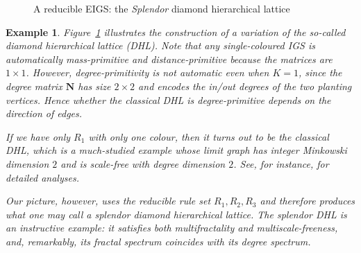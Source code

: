 \documentclass[12pt]{iopart}
\newtheorem{example}[theorem]{Example}
\begin{document}
\begin{figure}[ht]
{ 
}
    \caption{A reducible EIGS: the \emph{Splendor} diamond hierarchical lattice}
    \label{fig:splendor}
\end{figure}
\begin{example}

Figure~\ref{fig:splendor} illustrates the construction of a variation of 
the so-called diamond hierarchical lattice (DHL).
{ Note that any single-coloured IGS is automatically mass-primitive and distance-primitive because the matrices are $1 \times 1$.
However, degree-primitivity is not automatic even when $K=1$, since the degree matrix $\mathbf N$ has size $2\times 2$ and encodes the in/out degrees of the two planting vertices. 
Hence whether the classical DHL is degree-primitive depends on the direction of edges. }

If we have only $R_1$ with only one colour, 
then it turns out to be the classical DHL, 
which is a much-studied example 
whose limit graph has integer Minkowski dimension $2$ and is scale-free with degree dimension $2$. 
See, for instance, 
\cite{hambly2010diffusion,levitan2022renormalization,cruz2023percolation} for detailed analyses.

Our picture, however, uses the reducible rule set $R_1,R_2,R_3$ 
and therefore produces what one may call a {\em splendor diamond hierarchical lattice}. 
The splendor DHL is an instructive example: 
it satisfies both multifractality and multiscale-freeness, 
and, remarkably, its fractal spectrum coincides with its degree spectrum.
\end{example}
\end{document}
